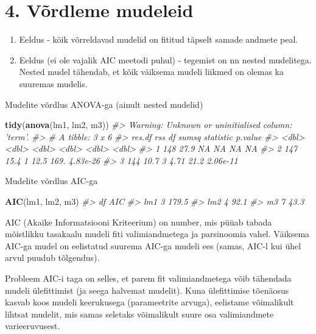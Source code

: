 \documentclass[]{book}
\newenvironment{Shaded}{\begin{snugshade}}{\end{snugshade}}
\newcommand{\KeywordTok}[1]{\textcolor[rgb]{0.13,0.29,0.53}{\textbf{#1}}}
\newcommand{\CommentTok}[1]{\textcolor[rgb]{0.56,0.35,0.01}{\textit{#1}}}
\newcommand{\NormalTok}[1]{#1}
\begin{document}
\section*{4. Võrdleme mudeleid}\label{vordleme-mudeleid}

\begin{enumerate}
\def\labelenumi{\arabic{enumi}.}
\item
  Eeldus - kõik võrreldavad mudelid on fititud täpselt samade andmete
  peal.
\item
  Eeldus (ei ole vajalik AIC meetodi puhul) - tegemist on nn nested
  mudelitega. Nested mudel tähendab, et kõik väiksema mudeli liikmed on
  olemas ka suuremas mudelis.
\end{enumerate}

Mudelite võrdlus ANOVA-ga (ainult nested mudelid)

\begin{Shaded}
\begin{Highlighting}[]
\KeywordTok{tidy}\NormalTok{(}\KeywordTok{anova}\NormalTok{(lm1, lm2, m3))}
\CommentTok{#> Warning: Unknown or uninitialised column: 'term'.}
\CommentTok{#> # A tibble: 3 x 6}
\CommentTok{#>   res.df   rss    df sumsq statistic   p.value}
\CommentTok{#>    <dbl> <dbl> <dbl> <dbl>     <dbl>     <dbl>}
\CommentTok{#> 1    148  27.9    NA NA         NA   NA       }
\CommentTok{#> 2    147  15.4     1 12.5      169.   4.83e-26}
\CommentTok{#> 3    144  10.7     3  4.71      21.2  2.06e-11}
\end{Highlighting}
\end{Shaded}

Mudelite võrdlus AIC-ga

\begin{Shaded}
\begin{Highlighting}[]
\KeywordTok{AIC}\NormalTok{(lm1, lm2, m3)}
\CommentTok{#>     df   AIC}
\CommentTok{#> lm1  3 179.5}
\CommentTok{#> lm2  4  92.1}
\CommentTok{#> m3   7  43.3}
\end{Highlighting}
\end{Shaded}

AIC (Akaike Informatsiooni Kriteerium) on number, mis püüab tabada
mõistlikku tasakaalu mudeli fiti valimiandmetega ja parsinoomia vahel.
Väiksema AIC-ga mudel on eelistatud suurema AIC-ga mudeli ees (samas,
AIC-l kui ühel arvul puudub tõlgendus).

Probleem AIC-i taga on selles, et parem fit valimiandmetega võib
tähendada mudeli ülefittimist (ja seega halvemat mudelit). Kuna
ülefittimise tõenäosus kasvab koos mudeli keerukusega (parameetrite
arvuga), eelistame võimalikult lihtsat mudelit, mis samas seletaks
võimalikult suure osa valimiandmete varieeruvusest.
\end{document}

